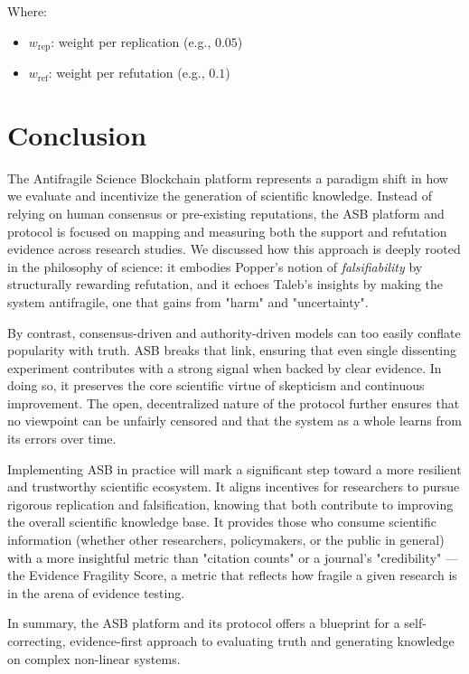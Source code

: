 \documentclass{article}
\begin{document}
Where:
\begin{itemize}
	\item $w_{\text{rep}}$: weight per replication (e.g., $0.05$)
	\item $w_{\text{ref}}$: weight per refutation (e.g., $0.1$)
\end{itemize}


\section{Conclusion}
The Antifragile Science Blockchain platform represents a paradigm shift in how we evaluate and incentivize the generation of scientific knowledge. Instead of relying on human consensus or pre-existing reputations, the ASB platform and protocol is focused on mapping and measuring both the support and refutation evidence across research studies. We discussed how this approach is deeply rooted in the philosophy of science: it embodies Popper's notion of \emph{falsifiability} by structurally rewarding refutation, and it echoes Taleb's insights by making the system antifragile, one that gains from "harm" and "uncertainty".

By contrast, consensus-driven and authority-driven models can too easily conflate popularity with truth. ASB breaks that link, ensuring that even single dissenting experiment contributes with a strong signal when backed by clear evidence. In doing so, it preserves the core scientific virtue of skepticism and continuous improvement. The open, decentralized nature of the protocol further ensures that no viewpoint can be unfairly censored and that the system as a whole learns from its errors over time.

Implementing ASB in practice will mark a significant step toward a more resilient and trustworthy scientific ecosystem. It aligns incentives for researchers to pursue rigorous replication and falsification, knowing that both contribute to improving the overall scientific knowledge base. It provides those who consume scientific information (whether other researchers, policymakers, or the public in general) with a more insightful metric than "citation counts" or a journal's "credibility" — the Evidence Fragility Score, a metric that reflects how fragile a given research is in the arena of evidence testing.

In summary, the ASB platform and its protocol offers a blueprint for a self-correcting, evidence-first approach to evaluating truth and generating knowledge on complex non-linear systems.




\end{document}
